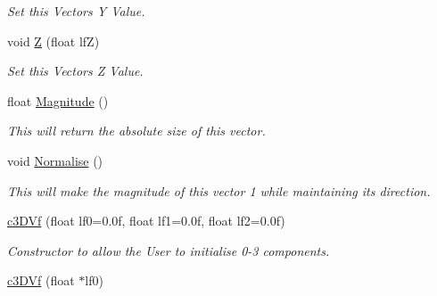 \begin{DoxyCompactItemize}
\begin{DoxyCompactList}\small\item\em Set this Vectors Y Value. \end{DoxyCompactList}\item 
\hypertarget{classc3_d_vf_a05f5b29c8a4fa090a7dc1fe78790ce19}{
void \hyperlink{classc3_d_vf_a05f5b29c8a4fa090a7dc1fe78790ce19}{Z} (float lfZ)}
\label{classc3_d_vf_a05f5b29c8a4fa090a7dc1fe78790ce19}

\begin{DoxyCompactList}\small\item\em Set this Vectors Z Value. \end{DoxyCompactList}\item 
\hypertarget{classc3_d_vf_a51e7f3135f7985012fb4ec32b2a4872c}{
float \hyperlink{classc3_d_vf_a51e7f3135f7985012fb4ec32b2a4872c}{Magnitude} ()}
\label{classc3_d_vf_a51e7f3135f7985012fb4ec32b2a4872c}

\begin{DoxyCompactList}\small\item\em This will return the absolute size of this vector. \end{DoxyCompactList}\item 
\hypertarget{classc3_d_vf_a2e5e5e198b5b5834e307aa29b09d203a}{
void \hyperlink{classc3_d_vf_a2e5e5e198b5b5834e307aa29b09d203a}{Normalise} ()}
\label{classc3_d_vf_a2e5e5e198b5b5834e307aa29b09d203a}

\begin{DoxyCompactList}\small\item\em This will make the magnitude of this vector 1 while maintaining its direction. \end{DoxyCompactList}\item 
\hypertarget{classc3_d_vf_aaf18775575ac9c7271e65a6bdd267afa}{
\hyperlink{classc3_d_vf_aaf18775575ac9c7271e65a6bdd267afa}{c3DVf} (float lf0=0.0f, float lf1=0.0f, float lf2=0.0f)}
\label{classc3_d_vf_aaf18775575ac9c7271e65a6bdd267afa}

\begin{DoxyCompactList}\small\item\em Constructor to allow the User to initialise 0-\/3 components. \end{DoxyCompactList}\item 
\hypertarget{classc3_d_vf_ad1a9c20b6420cf6f0f604ec25f58add4}{
\hyperlink{classc3_d_vf_ad1a9c20b6420cf6f0f604ec25f58add4}{c3DVf} (float $\ast$lf0)}
\label{classc3_d_vf_ad1a9c20b6420cf6f0f604ec25f58add4}


\end{DoxyCompactItemize}
